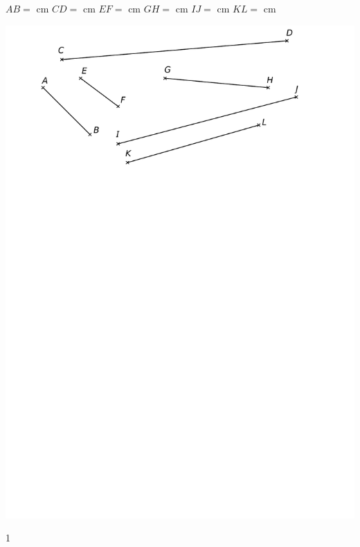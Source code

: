 \documentclass[a4paper,11pt]{report}
\begin{document}
\begin{exop}
{\begin{minipage}[t]{0.3\textwidth}{
\vspace{0pt}
\begin{tasks}
     \task $AB=$ cm
     \task $CD=$  cm
     \task $EF=$  cm
     \task $GH=$  cm
     \task $IJ=$ cm
     \task $KL=$  cm     
\end{tasks}
}
\end{minipage}
\begin{minipage}[t]{0.7\textwidth}{
\vspace{0pt}
\begin{center}
\includegraphics[scale=0.7]{media/es-11/13-12}
\end{center}
}
\end{minipage}
}
{1}
\end{exop}
\end{document}
